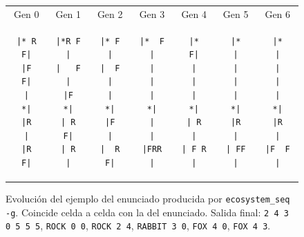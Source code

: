 \documentclass[11pt,a4paper]{article}
\begin{document}
\begin{figure}[H]
\centering
\small
\begin{tabular}{*{7}{c}}
Gen 0 & Gen 1 & Gen 2 & Gen 3 & Gen 4 & Gen 5 & Gen 6\\
\begin{minipage}{1.6cm}\begin{verbatim}
|* R F|
|F   F|
|    *|
|R    |
|R   F|
\end{verbatim}\end{minipage} &
\begin{minipage}{1.6cm}\begin{verbatim}
|*R F |
|   F |
|F   *|
| R  F|
| R   |
\end{verbatim}\end{minipage} &
\begin{minipage}{1.6cm}\begin{verbatim}
|* F  |
|  F  |
|    *|
|F    |
|  R F|
\end{verbatim}\end{minipage} &
\begin{minipage}{1.6cm}\begin{verbatim}
|*  F |
|     |
|    *|
|     |
|FRR  |
\end{verbatim}\end{minipage} &
\begin{minipage}{1.6cm}\begin{verbatim}
|*   F|
|     |
|    *|
| R   |
| F R |
\end{verbatim}\end{minipage} &
\begin{minipage}{1.6cm}\begin{verbatim}
|*    |
|     |
|    *|
|R    |
| FF  |
\end{verbatim}\end{minipage} &
\begin{minipage}{1.6cm}\begin{verbatim}
|*    |
|     |
|    *|
|R    |
|F  F |
\end{verbatim}\end{minipage}
\end{tabular}
\caption{Evolución del ejemplo del enunciado producida por \texttt{ecosystem\_seq -g}. Coincide celda a celda con la del enunciado. Salida final: \texttt{2 4 3 0 5 5 5}, \texttt{ROCK 0 0}, \texttt{ROCK 2 4}, \texttt{RABBIT 3 0}, \texttt{FOX 4 0}, \texttt{FOX 4 3}.}
\label{fig:ejemplo}
\end{figure}

\end{document}
